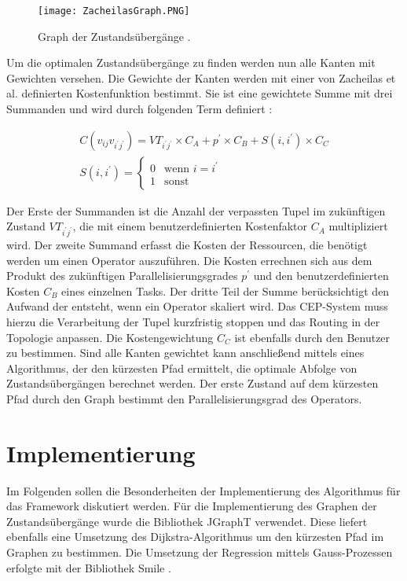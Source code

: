 \begin{figure}
\texttt{[image: ZacheilasGraph.PNG]}
\caption{Graph der Zustandsübergänge \cite{zacheilas_elastic_2015}.}
\end{figure}

Um die optimalen Zustandsübergänge zu finden werden nun alle Kanten mit Gewichten versehen.
Die Gewichte der Kanten werden mit einer von Zacheilas et al. definierten Kostenfunktion bestimmt. Sie ist eine gewichtete Summe mit drei Summanden und wird durch folgenden Term definiert \cite{zacheilas_elastic_2015}:

\begin{equation*}
\begin{split}
C(v_{ij}v_{i^\prime j^\prime}) = VT_{i^\prime j^\prime} \times  C_A + p^\prime \times C_B + S(i,i^\prime) \times C_C \\
   S(i,i^\prime) =
   \begin{cases}
     0 & \text{wenn } i = i^\prime \\
     1 & \text{sonst} 
   \end{cases}
\end{split}
\end{equation*}


Der Erste der Summanden ist die Anzahl der verpassten Tupel im zukünftigen Zustand \(VT_{i^\prime j^\prime}\), die mit einem benutzerdefinierten Kostenfaktor \(C_A\) multipliziert wird.
Der zweite Summand erfasst die Kosten der Ressourcen, die benötigt werden um einen Operator auszuführen.
Die Kosten errechnen sich aus dem Produkt des zukünftigen Parallelisierungsgrades \(p^\prime\) und den benutzerdefinierten Kosten \(C_B\) eines einzelnen Tasks.
Der dritte Teil der Summe berücksichtigt den Aufwand der entsteht, wenn ein Operator skaliert wird.
Das CEP-System muss hierzu die Verarbeitung der Tupel kurzfristig stoppen und das Routing in der Topologie anpassen.
Die Kostengewichtung \(C_C\) ist ebenfalls durch den Benutzer zu bestimmen.
Sind alle Kanten gewichtet kann anschließend mittels eines Algorithmus, der den kürzesten Pfad ermittelt, die optimale Abfolge von Zustandsübergängen berechnet werden.
Der erste Zustand auf dem kürzesten Pfad durch den Graph bestimmt den Parallelisierungsgrad des Operators.

\section{Implementierung}

Im Folgenden sollen die Besonderheiten der Implementierung des Algorithmus für das Framework diskutiert werden.
Für die Implementierung des Graphen der Zustandsübergänge wurde die Bibliothek JGraphT \cite{noauthor_welcome_nodate} verwendet.
Diese liefert ebenfalls eine Umsetzung des Dijkstra-Algorithmus um den kürzesten Pfad im Graphen zu bestimmen.
Die Umsetzung der Regression mittels Gauss-Prozessen erfolgte mit der Bibliothek Smile \cite{noauthor_smile_nodate}.


